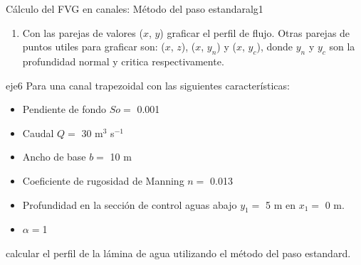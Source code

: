 \documentclass[11pt, oneside]{article}
\begin{document}
\begin{alg}{C\'alculo del FVG en canales: M\'etodo del paso estandar}{alg1}
\begin{enumerate}
\item Con las parejas de valores ($x$, $y$) graficar el perfil de flujo. Otras parejas de puntos utiles para graficar son: ($x$, $z$), ($x$, $y_n$) y ($x$, $y_c$), donde $y_n$ y $y_c$ son la profundidad normal y critica respectivamente. 
\end{enumerate}
\end{alg}

\begin{eje}{}{eje6}
 Para una canal trapezoidal con las siguientes caracter\'isticas:
 \begin{itemize}
     \item Pendiente de fondo $So =$ 0.001
     \item Caudal $Q = $ 30 m$^3$ s$^{-1}$
     \item Ancho de base $b =$ 10 m
     \item Coeficiente de rugosidad de Manning $n = $ 0.013
     \item Profundidad en la secci\'on de control aguas abajo $y_1 = $ 5 m en $x_1 =$ 0 m.
     \item $\alpha = $1
 \end{itemize}
 calcular el perfil de la l\'amina de agua utilizando el m\'etodo del paso estandard. 
\end{eje}



\end{document}
